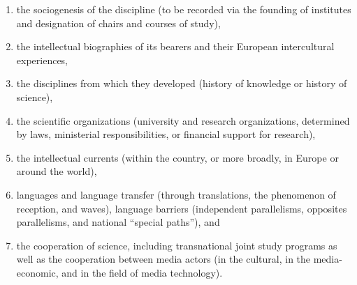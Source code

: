 \documentclass{tufte-handout}
\begin{document}
\begin{enumerate}
\item
  the sociogenesis of the discipline (to be recorded via the founding of
  institutes and designation of chairs and courses of study),
\item
  the intellectual biographies of its bearers and their European
  intercultural experiences,
\item
  the disciplines from which they developed (history of knowledge or
  history of science),
\item
  the scientific organizations (university and research organizations,
  determined by laws, ministerial responsibilities, or financial support
  for research),
\item
  the intellectual currents (within the country, or more broadly, in
  Europe or around the world),
\item
  languages and language transfer (through translations, the phenomenon
  of reception, and waves), language barriers (independent parallelisms,
  opposites parallelisms, and national ``special paths''), and
\item
  the cooperation of science, including transnational joint study
  programs as well as the cooperation between media actors (in the
  cultural, in the media-economic, and in the field of media
  technology).
\end{enumerate}
\end{document}
